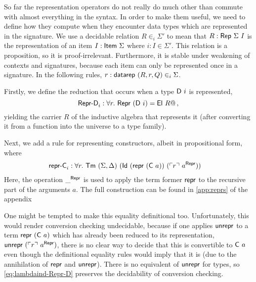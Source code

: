 So far the representation operators do not really do much other than commute
with almost everything in the syntax. In order to make
them useful, we need to define how they compute when they encounter data types
which are represented in the signature.
We use a decidable relation $R \in_i \Sigma'$ to mean that $R :
\textsf{Rep}\ \Sigma\ I$ is the representation of an item $I : \textsf{Item}\ \Sigma$
where $i : I \in \Sigma'$.
This relation is a proposition, so it is proof-irrelevant. Furthermore, it is stable under
weakening of contexts and signatures, because each item can only be represented once in a signature.
In the following rules, $r : \textsf{datarep}\ (R, r, Q) \in_i \Sigma$.

Firstly, we define the reduction that occurs when a type $\textsf{D}\ i$ is represented,
\begin{equation}
  \textsf{Repr-D}_i : \forall r.\ \textsf{Repr}\ (\textsf{D}\ i) = \textsf{El}\ R@ \,, \label{eq:lambdaind-Repr-D}
\end{equation}
yielding the carrier $R$ of the inductive algebra that represents it (after
converting it from a function into the universe to a type family).

Next, we add a rule for representing constructors, albeit in propositional form, where
\begin{align*}
&\mta{repr-C}_i : \forall r.\ \Tm\ (\Sigma, \Delta)\ (\mta{Id}\ (\Mrepr\ (\mta{C}\ a))\ (\emb{r}\ a^\mta{Repr}))
\end{align*}
Here, the operation $\_^{\textsf{Repr}}$ is used to apply the term former
$\textsf{repr}$ to the recursive part of the arguments $a$. The full construction
can be found in \cref{app:reprs} of the appendix

One might be tempted to make this equality definitional too. Unfortunately, this
would render conversion checking undecidable, because if one applies
$\textsf{unrepr}$ to a term $\textsf{repr}\ (\textsf{C}\ a)$ which has already been reduced
to its representation, $\textsf{unrepr}\ (\ulcorner r \urcorner\ a^{\textsf{Repr}})$, there is no
clear way to decide that this is convertible to $\textsf{C}\ a$ even though the
definitional equality rules would imply that it is (due
to the annihilation of $\textsf{repr}$ and $\textsf{unrepr}$). There is no
equivalent of $\textsf{unrepr}$ for types, so \eqref{eq:lambdaind-Repr-D} preserves
the decidability of conversion checking.


